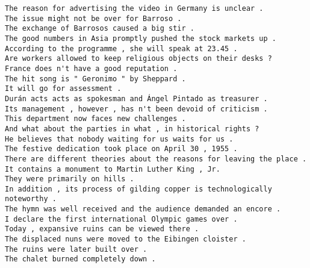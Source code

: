 \begin{verbatim}
The reason for advertising the video in Germany is unclear .
The issue might not be over for Barroso .
The exchange of Barrosos caused a big stir .
The good numbers in Asia promptly pushed the stock markets up .
According to the programme , she will speak at 23.45 .
Are workers allowed to keep religious objects on their desks ?
France does n't have a good reputation .
The hit song is " Geronimo " by Sheppard .
It will go for assessment .
Durán acts acts as spokesman and Ángel Pintado as treasurer .
Its management , however , has n't been devoid of criticism .
This department now faces new challenges .
And what about the parties in what , in historical rights ?
He believes that nobody waiting for us waits for us .
The festive dedication took place on April 30 , 1955 .
There are different theories about the reasons for leaving the place .
It contains a monument to Martin Luther King , Jr.
They were primarily on hills .
In addition , its process of gilding copper is technologically noteworthy .
The hymn was well received and the audience demanded an encore .
I declare the first international Olympic games over .
Today , expansive ruins can be viewed there .
The displaced nuns were moved to the Eibingen cloister .
The ruins were later built over .
The chalet burned completely down .
\end{verbatim}

